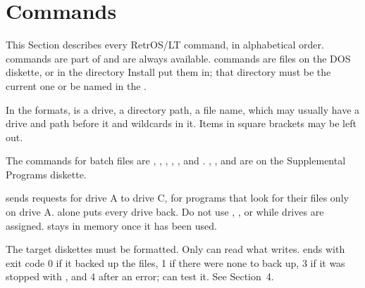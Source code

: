 \mwnewpart
\renewcommand\runningtitle{Section 6. Commands}
\chapter{Commands}
\startcontents[sec]

This Section describes every RetrOS/LT command, in alphabetical order.
 commands are part of  and are always
available.  commands are files on the DOS diskette, or in
the directory Install put them in; that directory must be the current one
or be named in the .

In the formats,  is a drive,  a directory path,
 a file name, which may usually have a drive and path before it
and wildcards in it. Items in square brackets may be left out.

The commands for batch files are , , ,
, ,  and . ,
,  and  are on the Supplemental
Programs diskette.

 sends requests for drive A to drive C, for programs that
look for their files only on drive A.  alone puts every drive
back. Do not use , ,  or
 while drives are assigned.  stays in memory once
it has been used.

\begin{opts}
\end{opts}
The target diskettes must be formatted. Only  can read what
 writes.  ends with exit code 0 if it backed up
the files, 1 if there were none to back up, 3 if it was stopped with
, and 4 after an error;  can test
it. See Section~4.

